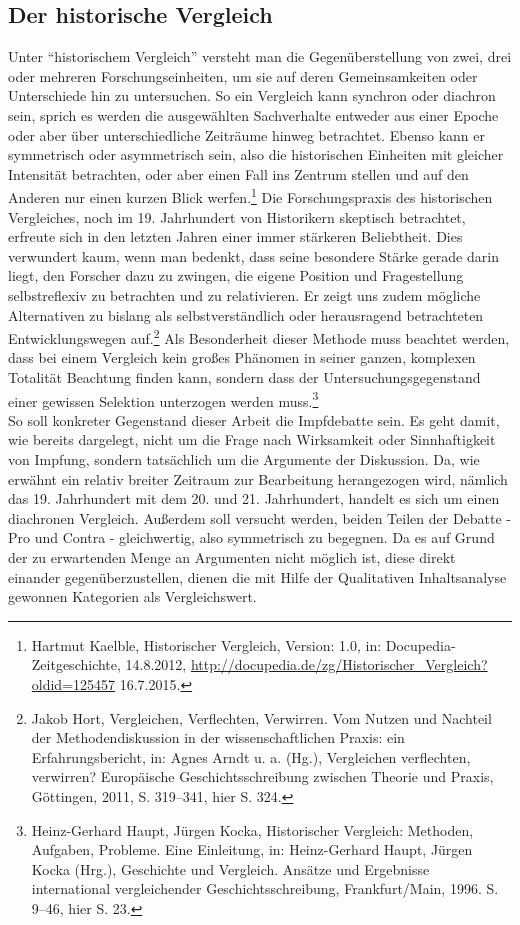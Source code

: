 \documentclass[
    a4paper,
    12pt,
    hyphens,
    chapterprefix=true,
    headheight=33pt,
    footheight=29pt,
    headings=optiontohead, %
]{scrartcl}
\begin{document}
 \subsection{Der historische Vergleich}
Unter "`historischem Vergleich"' versteht man die Gegenüberstellung von zwei, drei oder mehreren Forschungseinheiten, um sie auf deren Gemeinsamkeiten oder Unterschiede hin zu untersuchen. So ein Vergleich kann synchron oder diachron sein, sprich es werden die ausgewählten Sachverhalte entweder aus einer Epoche oder aber über unterschiedliche Zeiträume hinweg betrachtet. Ebenso kann er symmetrisch oder asymmetrisch sein, also die historischen Einheiten mit gleicher Intensität betrachten, oder aber einen Fall ins Zentrum stellen und auf den Anderen nur einen kurzen Blick werfen.\footnote{Hartmut Kaelble, Historischer Vergleich, Version: 1.0, in: Docupedia-Zeitgeschichte, 14.8.2012, \url{http://docupedia.de/zg/Historischer_Vergleich?oldid=125457} 16.7.2015.}
Die Forschungspraxis des historischen Vergleiches, noch im 19. Jahrhundert von Historikern skeptisch betrachtet, erfreute sich in den letzten Jahren einer immer stärkeren Beliebtheit. Dies verwundert kaum, wenn man bedenkt, dass seine besondere Stärke gerade darin liegt, den Forscher dazu zu zwingen, die eigene Position und Fragestellung selbstreflexiv zu betrachten und zu relativieren. Er zeigt uns zudem mögliche Alternativen zu bislang als selbstverständlich oder herausragend betrachteten Entwicklungswegen auf.\footnote{Jakob Hort, Vergleichen, Verflechten, Verwirren. Vom Nutzen und Nachteil der Methodendiskussion in der wissenschaftlichen Praxis: ein Erfahrungsbericht, in: Agnes Arndt u. a. (Hg.), Vergleichen verflechten, verwirren? Europäische  Geschichtsschreibung zwischen Theorie und Praxis, Göttingen, 2011, S. 319--341, hier S. 324.}  Als Besonderheit dieser Methode muss beachtet werden, dass bei einem Vergleich kein großes Phänomen in seiner ganzen, komplexen Totalität Beachtung finden kann, sondern dass der Untersuchungsgegenstand einer gewissen Selektion unterzogen werden muss.\footnote{Heinz-Gerhard Haupt, Jürgen Kocka, Historischer Vergleich: Methoden, Aufgaben, Probleme. Eine Einleitung, in: Heinz-Gerhard Haupt, Jürgen Kocka (Hrg.), Geschichte und Vergleich. Ansätze und Ergebnisse international vergleichender Geschichtsschreibung, Frankfurt/Main, 1996. S. 9--46, hier S. 23.}\\
So soll konkreter Gegenstand dieser Arbeit die Impfdebatte sein. Es geht damit, wie bereits dargelegt, nicht um die Frage nach Wirksamkeit oder Sinnhaftigkeit von Impfung, sondern tatsächlich um die Argumente der Diskussion. Da, wie erwähnt ein relativ breiter Zeitraum zur Bearbeitung herangezogen wird, nämlich das 19. Jahrhundert mit dem 20. und 21. Jahrhundert, handelt es sich um einen diachronen Vergleich. Außerdem soll versucht werden, beiden Teilen der Debatte - Pro und Contra - gleichwertig, also symmetrisch zu begegnen. Da es auf Grund der zu erwartenden Menge an Argumenten nicht möglich ist, diese direkt einander gegenüberzustellen, dienen die mit Hilfe der Qualitativen Inhaltsanalyse gewonnen Kategorien als Vergleichswert.
\end{document}
